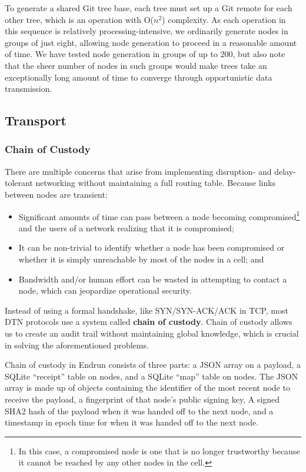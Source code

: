 \documentclass[12pt]{article}
\begin{document}
    To generate a shared Git tree base, each tree must set up a Git remote for each other tree, which is an operation with O($n^2$) complexity. As each operation in this sequence is relatively processing-intensive, we ordinarily generate nodes in groups of just eight, allowing node generation to proceed in a reasonable amount of time. We have tested node generation in groups of up to 200, but also note that the sheer number of nodes in such groups would make trees take an exceptionally long amount of time to converge through opportunistic data transmission.
    
  \subsection{Transport}
  
  \subsubsection{Chain of Custody}
  \label{subsec:chainofcustody}
  
  There are multiple concerns that arise from implementing disruption- and delay-tolerant networking without maintaining a full routing table. Because links between nodes are transient:
  \begin{itemize}
  
      \item Significant amounts of time can pass between a node becoming compromised\footnote{In this case, a compromised node is one that is no longer trustworthy because it cannot be reached by any other nodes in the cell.} and the users of a network realizing that it is compromised;
      \item It can be non-trivial to identify whether a node has been compromised or whether it is simply unreachable by most of the nodes in a cell; and
      \item Bandwidth and/or human effort can be wasted in attempting to contact a node, which can jeopardize operational security.
      
      \end{itemize}
    
  Instead of using a formal handshake, like SYN/SYN-ACK/ACK in TCP, most DTN protocols use a system called \textbf{chain of custody}. Chain of custody allows us to create an audit trail without maintaining global knowledge, which is crucial in solving the aforementioned problems.
  
  Chain of custody in Endrun consists of three parts: a JSON array on a payload, a SQLite ``receipt'' table on nodes, and a SQLite ``map'' table on nodes. The JSON array is made up of objects containing the identifier of the most recent node to receive the payload, a fingerprint of that node's public signing key, A signed SHA2 hash of the payload when it was handed off to the next node, and a timestamp in epoch time for when it was handed off to the next node. 
  
\end{document}
